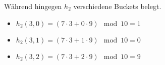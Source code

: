 \documentclass{lehramt-informatik-aufgabe}
\begin{document}
\begin{enumerate}
\begin{antwort}
Während hingegen $h_2$ verschiedene Buckets belegt.

\begin{itemize}
\item $h_2(3,0) = (7 \cdot 3 + 0 \cdot 9) \mod 10 = 1$
\item $h_2(3,1) = (7 \cdot 3 + 1 \cdot 9) \mod 10 = 0$
\item $h_2(3,2) = (7 \cdot 3 + 2 \cdot 9) \mod 10 = 9$
\end{itemize}
\end{antwort}
\end{enumerate}
\end{document}
